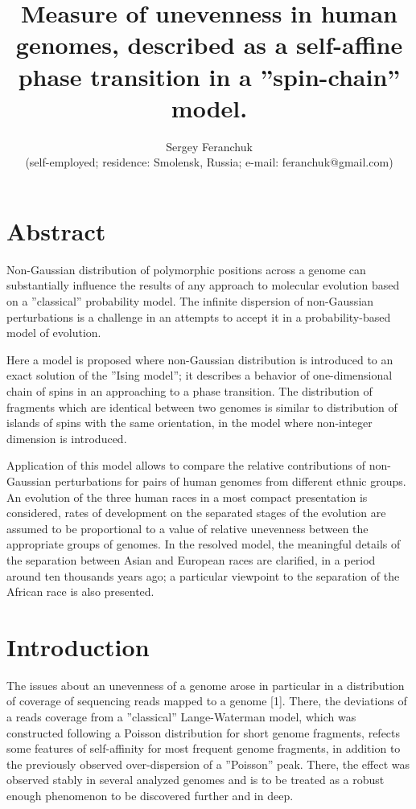 \documentclass[a4paper]{article}
\begin{document}
\title{Measure of unevenness in human genomes, described as a self-affine phase transition in a ''spin-chain'' model.}

\author{Sergey Feranchuk \\{\small(self-employed; residence: Smolensk, Russia; e-mail: feranchuk@gmail.com)}}

\maketitle

\section{Abstract}

Non-Gaussian distribution of polymorphic positions across a genome can substantially influence the results of any approach to molecular evolution based on a ''classical'' probability model. The infinite dispersion of non-Gaussian perturbations is a challenge in an attempts to accept it in a probability-based model of evolution.

Here a model is proposed where non-Gaussian distribution is introduced to an exact solution of the ''Ising model''; it describes a behavior of one-dimensional chain of spins in an approaching to a phase transition. The distribution of fragments which are identical between two genomes is similar to distribution of islands of spins with the same orientation, in the model where non-integer dimension is introduced.


Application of this model allows to compare the relative contributions of non-Gaussian perturbations for pairs of human genomes from different
ethnic groups. An evolution of the three human races in a most compact presentation is considered, rates of development on the separated stages
of the evolution are assumed to be proportional to a value of relative unevenness between the appropriate groups of genomes. In the resolved
model, the meaningful details of the separation between Asian and European races are clarified, in a period around ten thousands years ago; a
particular viewpoint to the separation of the African race is also presented.

\section{Introduction}

The issues about an unevenness of a genome arose in particular in a distribution of coverage of sequencing
reads mapped to a genome [1]. There, the deviations of a reads coverage from a ''classical'' Lange-Waterman
model, which was constructed following a Poisson distribution for short genome fragments, refects some features of self-affinity for most frequent genome fragments, in addition to the previously observed over-dispersion of a ''Poisson'' peak. There, the effect was observed stably in several analyzed genomes and is to be treated as a robust enough phenomenon to be discovered further and in deep.
\end{document}
